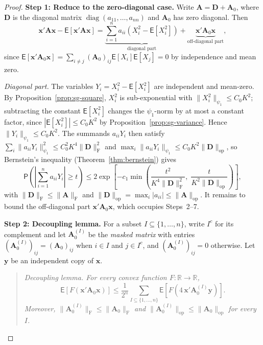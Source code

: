 \documentclass[14pt]{extarticle}
\theoremstyle{plain}
\theoremstyle{definition}
\theoremstyle{remark}
\newcommand\expc{\mathsf{E}}
\newcommand\prb{\mathsf{P}}
\DeclareMathOperator\diag{diag}
\newcommand{\by}{\mathbf{y}}
\newcommand{\bx}{\mathbf{x}}
\newcommand{\bA}{\mathbf{A}}
\newcommand{\bD}{\mathbf{D}}
\newcommand{\Real}{\mathbb{R}}
\newcommand{\opnorm}[1]{\|#1\|_{\mathrm{op}}}
\newcommand{\fnorm}[1]{\|#1\|_{\mathrm{F}}}
\begin{document}
\begin{proof}
\textbf{Step 1: Reduce to the zero-diagonal case.} Write $\bA = \bD + \bA_0$, where $\bD$ is the diagonal matrix $\diag(a_{11}, \ldots, a_{nn})$ and $\bA_0$ has zero diagonal. Then
\[
\bx'\bA\bx - \expc[\bx'\bA\bx] = \underbrace{\sum_{i=1}^n a_{ii}(X_i^2 - \expc[X_i^2])}_{\text{diagonal part}} + \underbrace{\bx'\bA_0\bx}_{\text{off-diagonal part}},
\]
since $\expc[\bx'\bA_0\bx] = \sum_{i \neq j}(\bA_0)_{ij}\expc[X_i]\expc[X_j] = 0$ by independence and mean zero.

\emph{Diagonal part.} The variables $Y_i = X_i^2 - \expc[X_i^2]$ are independent and mean-zero. By Proposition~\ref{prop:sg-square}, $X_i^2$ is sub-exponential with $\|X_i^2\|_{\psi_1} \leqslant C_0 K^2$; subtracting the constant $\expc[X_i^2]$ changes the $\psi_1$-norm by at most a constant factor, since $|\expc[X_i^2]| \leqslant C_0 K^2$ by Proposition~\ref{prop:sg-variance}. Hence $\|Y_i\|_{\psi_1} \leqslant C_0 K^2$. The summands $a_{ii}Y_i$ then satisfy $\sum_i \|a_{ii}Y_i\|_{\psi_1}^2 \leqslant C_0^2 K^4\fnorm{\bD}^2$ and $\max_i \|a_{ii}Y_i\|_{\psi_1} \leqslant C_0 K^2\opnorm{\bD}$, so Bernstein's inequality (Theorem~\ref{thm:bernstein}) gives
\begin{equation}\label{eq:hw-diagonal}
\prb\!\left(\left|\sum_{i=1}^n a_{ii}Y_i\right| \geqslant t\right) \leqslant 2\exp\!\left[-c_1\min\!\left(\frac{t^2}{K^4\fnorm{\bD}^2},\;\frac{t}{K^2\opnorm{\bD}}\right)\right],
\end{equation}
with $\fnorm{\bD} \leqslant \fnorm{\bA}$ and $\opnorm{\bD} = \max_i|a_{ii}| \leqslant \opnorm{\bA}$. It remains to bound the off-diagonal part $\bx'\bA_0\bx$, which occupies Steps~2--7.

\textbf{Step 2: Decoupling lemma.} For a subset $I \subseteq \{1, \ldots, n\}$, write $I^c$ for its complement and let $\bA_0^{(I)}$ be the \emph{masked matrix} with entries $(\bA_0^{(I)})_{ij} = (\bA_0)_{ij}$ when $i \in I$ and $j \in I^c$, and $(\bA_0^{(I)})_{ij} = 0$ otherwise. Let $\by$ be an independent copy of $\bx$.

\begin{quote}
\emph{Decoupling lemma. For every convex function $F : \Real \to \Real$,}
\begin{equation}\label{eq:hw-decoupling}
\expc[F(\bx'\bA_0\bx)] \leqslant \frac{1}{2^n}\sum_{I \subseteq \{1,\ldots,n\}} \expc\!\left[F\!\left(4\,\bx'\bA_0^{(I)}\by\right)\right].
\end{equation}
\emph{Moreover, $\fnorm{\bA_0^{(I)}} \leqslant \fnorm{\bA_0}$ and $\opnorm{\bA_0^{(I)}} \leqslant \opnorm{\bA_0}$ for every $I$.}
\end{quote}


\end{proof}
\end{document}
